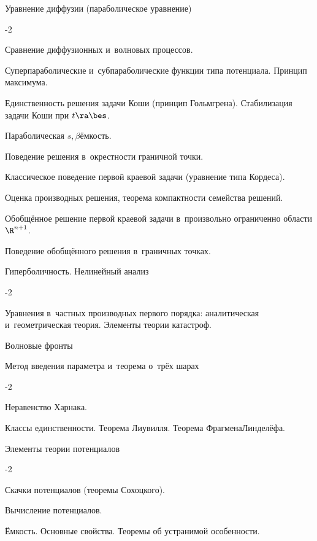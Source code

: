 \documentclass[a4paper]{article}
\def\internalskip{-2}
\begin{document}
{\begin{items}{-7}
  \item Уравнение диффузии (параболическое уравнение)
  \vss

  \begin{nums}{\internalskip}
    \item Сравнение диффузионных и~волновых процессов.
    \item Суперпараболические и~субпараболические функции типа потенциала. Принцип максимума.
    \item Единственность решения задачи Коши (принцип Гольмгрена). Стабилизация задачи Коши при $t\ra\bes$.
    \item Параболическая $s,\beta$\д ёмкость.
    \item Поведение решения в~окрестности граничной точки.
    \item Классическое поведение первой краевой задачи (уравнение типа Кордеса).
    \item Оценка производных решения, теорема компактности семейства решений.
    \item Обобщённое решение первой краевой задачи в~произвольно ограниченно области $\R^{n+1}$.
    \item Поведение обобщённого решения в~граничных точках.
  \end{nums}

  \item Гиперболичность. Нелинейный анализ
  \vss

  \begin{nums}{\internalskip}
    \item Уравнения в~частных производных первого порядка: аналитическая и~геометрическая теория.
          Элементы теории катастроф.
    \item Волновые фронты
  \end{nums}

  \item Метод введения параметра и~теорема о~трёх шарах
  \vss

  \begin{nums}{\internalskip}
    \item Неравенство Харнака.
    \item Классы единственности. Теорема Лиувилля. Теорема Фрагмена\ч Линделёфа.
  \end{nums}

  \item Элементы теории потенциалов
  \vss

  \begin{nums}{\internalskip}
    \item Скачки потенциалов (теоремы Сохоцкого).
    \item Вычисление потенциалов.
    \item Ёмкость. Основные свойства. Теоремы об устранимой особенности.
  \end{nums}

\end{items}%
}%
\end{document}
